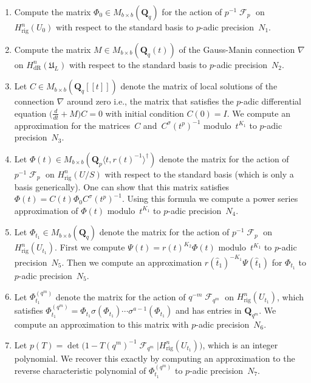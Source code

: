 \documentclass[a4paper,11pt]{article}
\makeatletter
\numberwithin{equation}{section}
\DeclareMathOperator{\Frob}{\mathcal{F}} %
\providecommand{\HdR}{H_{\text{dR}}}    %
\providecommand{\Hrig}{H_{\text{rig}}}  %
\theoremstyle{definition}
\newcommand{\Rmnum}[1]{\expandafter\@slowromancap\romannumeral #1@}
\makeatother
\begin{document}
\begin{enumerate}
\item[Step~$\Rmnum{1}$.]
Compute the matrix $\Phi_0 \in M_{b \times b}(\mathbf{Q}_q)$ for the action of $p^{-1} \Frob_p$ on 
$\Hrig^{n}(U_0)$ with respect to the standard basis to $p$-adic precision~$N_1$.  
\item[Step~$\Rmnum{2}$.]
Compute the matrix $M \in M_{b \times b}(\mathbf{Q}_q(t))$ of the Gauss-Manin connection $\nabla$ on 
$\HdR^{n}(\mathfrak{U}_L)$ 
with respect to the standard basis to $p$-adic precision~$N_2$.
\item[Step~$\Rmnum{3}$.]
Let $C \in M_{b \times b} (\mathbf{Q}_q[[t]])$ denote the matrix of local solutions of the connection $\nabla$ around zero i.e., 
the matrix that satisfies the $p$-adic differential equation $\bigl(\tfrac{d}{dt} + M\bigr) C = 0$ with
initial condition $C(0)=I$.  We compute an approximation for the matrices~$C$ and~$C^{\sigma}(t^p)^{-1}$
modulo~$t^{K_1}$ to $p$-adic precision~$N_3$.
\item[Step~$\Rmnum{4}$.]
Let $\Phi(t) \in M_{b \times b}(\mathbf{Q}_p\langle t,r(t)^{-1}\rangle^{\dagger})$ denote the matrix for the action of $p^{-1} \Frob_p$ on 
$\Hrig^{n}(U/S)$ with respect to the standard basis (which is only a basis generically). One can show that 
this matrix satisfies $\Phi(t) = C(t) \Phi_0 C^{\sigma}(t^p)^{-1}$.  
Using this formula we compute a power series approximation of $\Phi(t)$ modulo~$t^{K_1}$ to $p$-adic precision~$N_4$.
\item[Step~$\Rmnum{5}$.]
Let $\Phi_{t_1} \in M_{b \times b}(\mathbf{Q}_q)$ denote the matrix for the action of $p^{-1} \Frob_p$ 
on $\Hrig^{n}(U_{t_1})$. First we compute $\Psi(t) = r(t)^{K_2} \Phi(t)$ modulo~$t^{K_1}$ to $p$-adic precision~$N_5$.  Then we compute  
an approximation $r(\hat{t}_1)^{-K_1} \Psi(\hat{t}_1)$ for $\Phi_{t_1}$ to $p$-adic precision~$N_5$.
\item[Step~$\Rmnum{6}$.]
Let $\Phi_{t_1}^{(q^m)}$ denote the matrix for the action of $q^{-m} \Frob_{q^m}$ on 
$\Hrig^{n}(U_{t_1})$, which satisfies 
$\Phi_{t_1}^{(q^m)} = \Phi_{t_1} \sigma(\Phi_{t_1}) \dotsm \sigma^{a-1}(\Phi_{t_1})$ 
and has entries in $\mathbf{Q}_{q^m}$.  We compute an approximation to this matrix with $p$-adic precision~$N_6$.
\item[Step~$\Rmnum{7}$.]
Let $p(T) = \det\bigl(1 - T (q^m)^{-1} \Frob_{q^m} | \Hrig^n(U_{t_1})\bigr)$, 
which is an integer polynomial.  We recover this exactly 
by computing an approximation to the reverse characteristic polynomial 
of $\Phi_{t_1}^{(q^m)}$ to $p$-adic precision~$N_7$.
\end{enumerate}
\end{document}
